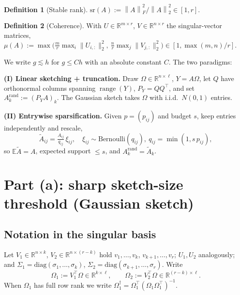 \documentclass{amsart}
\theoremstyle{definition}
\newtheorem{definition}{Definition}
\DeclareMathOperator{\range}{range}
\newcommand{\R}{\mathbb{R}}
\newcommand{\Frob}[1]{\left\lVert #1\right\rVert_F}
\newcommand{\Op}[1]{\left\lVert #1\right\rVert_2}
\newcommand{\Atil}{\widetilde{A}}
\newcommand{\E}{\mathbb{E}}
\begin{document}
\begin{definition}[Stable rank]\label{def:srank}
$\mathrm{sr}(A):=\Frob{A}^2/\Op{A}^2\in[1,r]$.
\end{definition}
\begin{definition}[Coherence]\label{def:coh}
With $U\in\R^{m\times r}$, $V\in\R^{n\times r}$ the singular-vector matrices,
$\mu(A):=\max\big(\tfrac{m}{r}\max_i\|U_{i,:}\|_2^2,\
\tfrac{n}{r}\max_j\|V_{j,:}\|_2^2\big)\in[1,\max(m,n)/r]$.
\end{definition}

We write $g\lesssim h$ for $g\le Ch$ with an absolute constant $C$. The two
paradigms:

\smallskip
\noindent\textbf{(I) Linear sketching + truncation.} Draw
$\Omega\in\R^{n\times\ell}$, $Y=A\Omega$, let $Q$ have orthonormal columns
spanning $\range(Y)$, $P_Y=QQ^\top$, and set $A_k^{\mathrm{rand}}:=(P_YA)_k$.
The Gaussian sketch takes $\Omega$ with i.i.d.\ $N(0,1)$ entries.

\smallskip
\noindent\textbf{(II) Entrywise sparsification.} Given $p=(p_{ij})$ and budget
$s$, keep entries independently and rescale,
\begin{equation}\label{eq:entrywise}
\Atil_{ij}=\tfrac{A_{ij}}{q_{ij}}\,\xi_{ij},\quad
\xi_{ij}\sim\mathrm{Bernoulli}(q_{ij}),\ q_{ij}=\min(1,s\,p_{ij}),
\end{equation}
so $\E\Atil=A$, expected support $\le s$, and $A_k^{\mathrm{rand}}=\Atil_k$.

\section{Part (a): sharp sketch-size threshold (Gaussian sketch)}

\subsection{Notation in the singular basis}
Let $V_1\in\R^{n\times k}$, $V_2\in\R^{n\times(r-k)}$ hold $v_1,\dots,v_k$,
$v_{k+1},\dots,v_r$; $U_1,U_2$ analogously; and
$\Sigma_1=\mathrm{diag}(\sigma_1,\dots,\sigma_k)$,
$\Sigma_2=\mathrm{diag}(\sigma_{k+1},\dots,\sigma_r)$. Write
\begin{equation}\label{eq:OmBlocks}
\Omega_1:=V_1^\top\Omega\in\R^{k\times\ell},\qquad
\Omega_2:=V_2^\top\Omega\in\R^{(r-k)\times\ell}.
\end{equation}
When $\Omega_1$ has full row rank we write
$\Omega_1^{\dagger}=\Omega_1^\top(\Omega_1\Omega_1^\top)^{-1}$.
\end{document}
